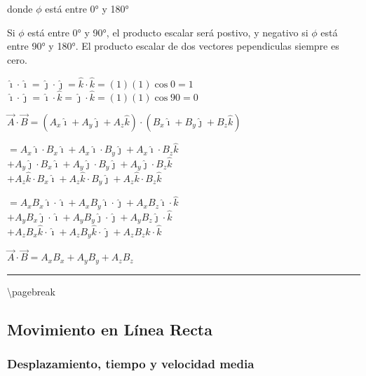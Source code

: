 \documentclass[
]{article}
\begin{document}
donde {\(\phi\)} está entre 0° y 180°

Si {\(\phi\)} está entre 0° y 90°, el producto escalar será postivo, y
negativo si {\(\phi\)} está entre 90° y 180°. El producto escalar de dos
vectores pependiculas siempre es cero.

{\(\hat{\imath} \cdot \hat{\imath} = \hat{\jmath} \cdot \hat{\jmath} = \hat{k} \cdot \hat{k} = (1)(1)\cos 0 = 1\)}\\
{\(\hat{\imath} \cdot \hat{\jmath} = \hat{\imath} \cdot \hat{k} = \hat{\jmath} \cdot \hat{k} = (1)(1)\cos 90 = 0\)}

{\(\overset{\rightarrow}{A} \cdot \overset{\rightarrow}{B} = (A_{x}\hat{\imath} + A_{y}\hat{\jmath} + A_{z}\hat{k}) \cdot (B_{x}\hat{\imath} + B_{y}\hat{\jmath} + B_{z}\hat{k})\)}

{\(= A_{x}\hat{\imath} \cdot B_{x}\hat{\imath} + A_{x}\hat{\imath} \cdot B_{y}\hat{\jmath} + A_{x}\hat{\imath} \cdot B_{z}\hat{k}\)}\\
{\(+ A_{y}\hat{\jmath} \cdot B_{x}\hat{\imath} + A_{y}\hat{\jmath} \cdot B_{y}\hat{\jmath} + A_{y}\hat{\jmath} \cdot B_{z}\hat{k}\)}\\
{\(+ A_{z}\hat{k} \cdot B_{x}\hat{\imath} + A_{z}\hat{k} \cdot B_{y}\hat{\jmath} + A_{z}\hat{k} \cdot B_{z}\hat{k}\)}

{\(= A_{x}B_{x}\hat{\imath} \cdot \hat{\imath} + A_{x}B_{y}\hat{\imath} \cdot \hat{\jmath} + A_{x}B_{z}\hat{\imath} \cdot \hat{k}\)}\\
{\(+ A_{y}B_{x}\hat{\jmath} \cdot \hat{\imath} + A_{y}B_{y}\hat{\jmath} \cdot \hat{\jmath} + A_{y}B_{z}\hat{\jmath} \cdot \hat{k}\)}\\
{\(+ A_{z}B_{x}\hat{k} \cdot \hat{\imath} + A_{z}B_{y}\hat{k} \cdot \hat{\jmath} + A_{z}B_{z}\hat{k} \cdot \hat{k}\)}

{\(\overset{\rightarrow}{A} \cdot \overset{\rightarrow}{B} = A_{x}B_{x} + A_{y}B_{y} + A_{z}B_{z}\)}

\begin{center}\rule{0.5\linewidth}{0.5pt}\end{center}

\textbackslash pagebreak

\hypertarget{movimiento-en-luxednea-recta}{%
\subsection{Movimiento en Línea
Recta}\label{movimiento-en-luxednea-recta}}

\hypertarget{desplazamiento-tiempo-y-velocidad-media}{%
\subsubsection{Desplazamiento, tiempo y velocidad
media}\label{desplazamiento-tiempo-y-velocidad-media}}
\end{document}
